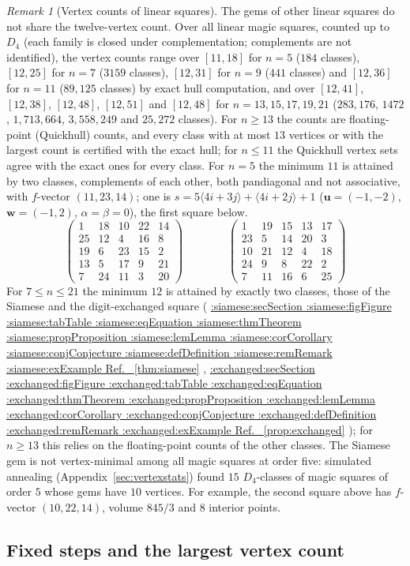 \documentclass[11pt,a4paper]{article}
\makeatletter
\def\Cref@getprefix#1:#2\relax{#1}
\def\Cref@prefix@sec{sec}
\def\Cref@prefix@fig{fig}
\def\Cref@prefix@tab{tab}
\def\Cref@prefix@eq{eq}
\def\Cref@prefix@thm{thm}
\def\Cref@prefix@prop{prop}
\def\Cref@prefix@lem{lem}
\def\Cref@prefix@cor{cor}
\def\Cref@prefix@conj{conj}
\def\Cref@prefix@def{def}
\def\Cref@prefix@rem{rem}
\def\Cref@prefix@ex{ex}
\def\Cref@type@cap#1{%
  \edef\Cref@tmp{#1}%
  \ifx\Cref@tmp\Cref@prefix@sec Section%
  \else\ifx\Cref@tmp\Cref@prefix@fig Figure%
  \else\ifx\Cref@tmp\Cref@prefix@tab Table%
  \else\ifx\Cref@tmp\Cref@prefix@eq Equation%
  \else\ifx\Cref@tmp\Cref@prefix@thm Theorem%
  \else\ifx\Cref@tmp\Cref@prefix@prop Proposition%
  \else\ifx\Cref@tmp\Cref@prefix@lem Lemma%
  \else\ifx\Cref@tmp\Cref@prefix@cor Corollary%
  \else\ifx\Cref@tmp\Cref@prefix@conj Conjecture%
  \else\ifx\Cref@tmp\Cref@prefix@def Definition%
  \else\ifx\Cref@tmp\Cref@prefix@rem Remark%
  \else\ifx\Cref@tmp\Cref@prefix@ex Example%
  \else Ref.%
  \fi\fi\fi\fi\fi\fi\fi\fi\fi\fi\fi\fi
}
\DeclareRobustCommand{\Cref}[1]{%
  \begingroup
  \edef\Cref@label{#1}%
  \edef\Cref@prefix{\expandafter\Cref@getprefix\Cref@label:\relax}%
  \hyperref[#1]{\Cref@type@cap{\Cref@prefix}~\ref*{#1}}%
  \endgroup
}
\theoremstyle{plain}
\theoremstyle{definition}
\theoremstyle{remark}
\newtheorem{remark}[theorem]{Remark}
\makeatother
\begin{document}
\begin{remark}[Vertex counts of linear squares]
\label{rem:linear}
The gems of other linear squares do not share the twelve-vertex count.
Over all linear magic squares, counted up to $D_4$ (each family is closed under complementation; complements are not identified), the vertex counts range over $[11,18]$ for $n=5$ ($184$ classes), $[12,25]$ for $n=7$ ($3159$ classes), $[12,31]$ for $n=9$ ($441$ classes) and $[12,36]$ for $n=11$ ($89{,}125$ classes) by exact hull computation, and over $[12,41]$, $[12,38]$, $[12,48]$, $[12,51]$ and $[12,48]$ for $n=13,15,17,19,21$ ($283{,}176$, $1472$, $1{,}713{,}664$, $3{,}558{,}249$ and $25{,}272$ classes).
For $n\ge13$ the counts are floating-point (Quickhull) counts, and every class with at most $13$ vertices or with the largest count is certified with the exact hull; for $n\le11$ the Quickhull vertex sets agree with the exact ones for every class.
For $n=5$ the minimum $11$ is attained by two classes, complements of each other, both pandiagonal and not associative, with $f$-vector $(11,23,14)$; one is $s=5\langle4i+3j\rangle+\langle4i+2j\rangle+1$ ($\mathbf u=(-1,-2)$, $\mathbf w=(-1,2)$, $\alpha=\beta=0$), the first square below.
\[
\begin{pmatrix}1&18&10&22&14\\25&12&4&16&8\\19&6&23&15&2\\13&5&17&9&21\\7&24&11&3&20\end{pmatrix}
\qquad\qquad
\begin{pmatrix}1&19&15&13&17\\23&5&14&20&3\\10&21&12&4&18\\24&9&8&22&2\\7&11&16&6&25\end{pmatrix}
\]
For $7\le n\le21$ the minimum $12$ is attained by exactly two classes, those of the Siamese and the digit-exchanged square (\Cref{thm:siamese}, \Cref{prop:exchanged}); for $n\ge13$ this relies on the floating-point counts of the other classes.
The Siamese gem is not vertex-minimal among all magic squares at order five: simulated annealing (Appendix~\ref{sec:vertexstats}) found $15$ $D_4$-classes of magic squares of order $5$ whose gems have $10$ vertices. For example, the second square above has $f$-vector $(10,22,14)$, volume $845/3$ and $8$ interior points.
\end{remark}

\subsection{Fixed steps and the largest vertex count}
\label{sec:fixed-steps}
\end{document}

